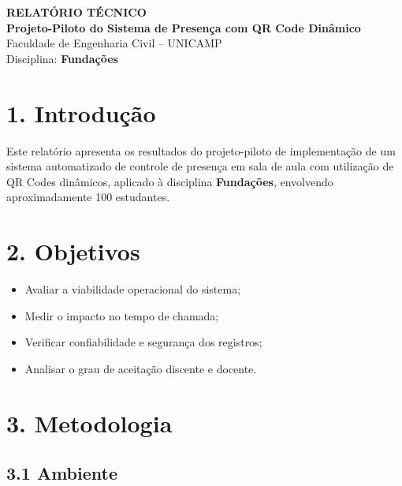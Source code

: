 \documentclass[12pt,a4paper]{article}
\begin{document}
\begin{center}
    \Large\textbf{RELATÓRIO TÉCNICO}\\[0.3cm]
    \large\textbf{Projeto-Piloto do Sistema de Presença com QR Code Dinâmico}\\[0.3cm]
    \normalsize Faculdade de Engenharia Civil -- UNICAMP\\
    Disciplina: \textbf{Fundações}
\end{center}

\vspace{1cm}


\section*{1. Introdução}

Este relatório apresenta os resultados do projeto-piloto de implementação de um sistema automatizado de controle de presença em sala de aula com utilização de QR Codes dinâmicos, aplicado à disciplina \textbf{Fundações}, envolvendo aproximadamente 100 estudantes.


\section*{2. Objetivos}

\begin{itemize}
    \item Avaliar a viabilidade operacional do sistema;
    \item Medir o impacto no tempo de chamada;
    \item Verificar confiabilidade e segurança dos registros;
    \item Analisar o grau de aceitação discente e docente.
\end{itemize}


\section*{3. Metodologia}

\subsection*{3.1 Ambiente}
\end{document}
